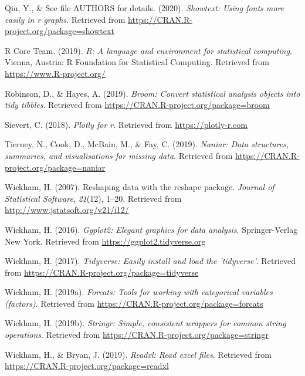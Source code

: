 \documentclass[english,man,floatsintext]{apa6}
\begin{document}
\leavevmode\hypertarget{ref-R-showtext}{}%
Qiu, Y., \& See file AUTHORS for details. (2020). \emph{Showtext: Using fonts more easily in r graphs}. Retrieved from \url{https://CRAN.R-project.org/package=showtext}

\leavevmode\hypertarget{ref-R-base}{}%
R Core Team. (2019). \emph{R: A language and environment for statistical computing}. Vienna, Austria: R Foundation for Statistical Computing. Retrieved from \url{https://www.R-project.org/}

\leavevmode\hypertarget{ref-R-broom}{}%
Robinson, D., \& Hayes, A. (2019). \emph{Broom: Convert statistical analysis objects into tidy tibbles}. Retrieved from \url{https://CRAN.R-project.org/package=broom}

\leavevmode\hypertarget{ref-R-plotly}{}%
Sievert, C. (2018). \emph{Plotly for r}. Retrieved from \url{https://plotly-r.com}

\leavevmode\hypertarget{ref-R-naniar}{}%
Tierney, N., Cook, D., McBain, M., \& Fay, C. (2019). \emph{Naniar: Data structures, summaries, and visualisations for missing data}. Retrieved from \url{https://CRAN.R-project.org/package=naniar}

\leavevmode\hypertarget{ref-R-reshape2}{}%
Wickham, H. (2007). Reshaping data with the reshape package. \emph{Journal of Statistical Software}, \emph{21}(12), 1--20. Retrieved from \url{http://www.jstatsoft.org/v21/i12/}

\leavevmode\hypertarget{ref-R-ggplot2}{}%
Wickham, H. (2016). \emph{Ggplot2: Elegant graphics for data analysis}. Springer-Verlag New York. Retrieved from \url{https://ggplot2.tidyverse.org}

\leavevmode\hypertarget{ref-R-tidyverse}{}%
Wickham, H. (2017). \emph{Tidyverse: Easily install and load the 'tidyverse'}. Retrieved from \url{https://CRAN.R-project.org/package=tidyverse}

\leavevmode\hypertarget{ref-R-forcats}{}%
Wickham, H. (2019a). \emph{Forcats: Tools for working with categorical variables (factors)}. Retrieved from \url{https://CRAN.R-project.org/package=forcats}

\leavevmode\hypertarget{ref-R-stringr}{}%
Wickham, H. (2019b). \emph{Stringr: Simple, consistent wrappers for common string operations}. Retrieved from \url{https://CRAN.R-project.org/package=stringr}

\leavevmode\hypertarget{ref-R-readxl}{}%
Wickham, H., \& Bryan, J. (2019). \emph{Readxl: Read excel files}. Retrieved from \url{https://CRAN.R-project.org/package=readxl}
\end{document}
